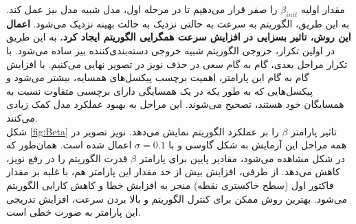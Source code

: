 \documentclass[11.5pt,a4paper]{article}
\begin{document}
مقدار اولیه $\beta_{init}$ را صفر قرار می‌دهیم تا در مرحله اول، مدل شبیه مدل بیز عمل کند. به این طریق، الگوریتم به سرعت به حالتی نزدیک به حالت بهینه نزدیک می‌شود. \textbf{اعمال این روش، تاثیر بسزایی در افزایش سرعت همگرایی الگوریتم ایجاد کرد.} به این طریق در اولین تکرار، خروجی الگوریتم شبیه خروجی دسته‌بندی‌کننده بیز ساده می‌شود. با تکرار مراحل بعدی، گام به گام سعی در حذف نویز در تصویر نهایی می‌کنیم. با افزایش گام به گام این پارامتر، اهمیت برچسب پیکسل‌های همسایه،‌ بیشتر می‌شود و پیکسل‌هایی که به طور یکه در یک همسایگی دارای برچسبی متفاوت نسبت به همسایگان خود هستند، تصحیح می‌شوند. این مراحل به بهبود عملکرد مدل کمک زیادی می‌کنند.
\\
شکل 
\ref{fig:Beta}
تاثیر پارامتر $\beta$ را بر عملکرد الگوریتم نمایش می‌دهد.
نویز تصویر در همه مراحل این آزمایش به شکل گاوسی و با $\sigma=0.1$ اعمال شده است. همان‌طور که در شکل مشاهده می‌شود، مقادیر پایین برای پارامتر $\beta$ قدرت الگوریتم را در رفع نویز، کاهش می‌دهد.
از طرفی، افزایش بیش از حد مقدار این پارامتر هم، با غلبه بر مقدار فاکتور اول (سطح خاکستری نقطه) منجر به افزایش خطا و کاهش کارایی الگوریتم می‌شود. بهترین روش ممکن برای کنترل الگوریتم و بالا بردن سرعت، افزایش تدریجی این پارامتر به صورت خطی است.
\end{document}
